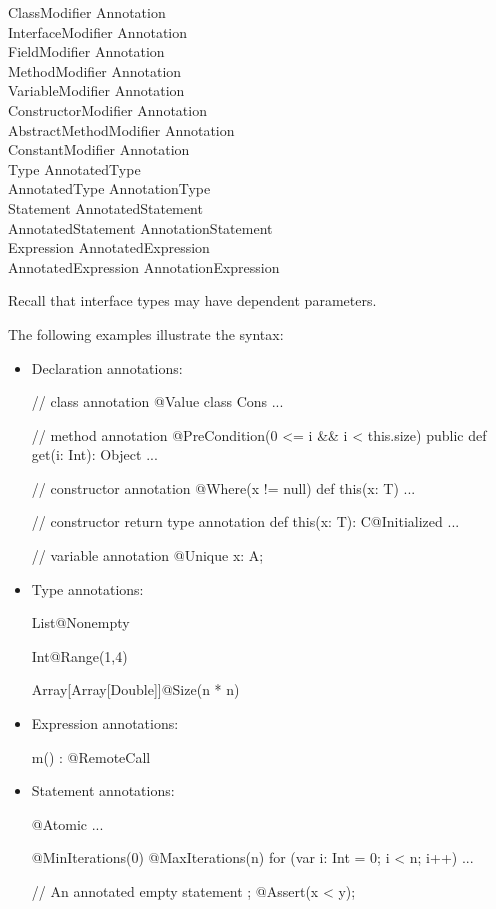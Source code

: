 \begin{grammar}
ClassModifier \: Annotation \\
InterfaceModifier \: Annotation \\
FieldModifier \: Annotation \\
MethodModifier \: Annotation \\
VariableModifier \: Annotation \\
ConstructorModifier \: Annotation \\
AbstractMethodModifier \: Annotation \\
ConstantModifier \: Annotation \\
Type \: AnnotatedType \\
AnnotatedType \: Annotation\plus Type \\
Statement \: AnnotatedStatement \\
AnnotatedStatement \: Annotation\plus Statement \\
Expression \: AnnotatedExpression \\
AnnotatedExpression \: Annotation\plus Expression \\
\end{grammar}

\noindent
Recall that interface types may have dependent parameters.

\noindent
The following examples illustrate the syntax:

\begin{itemize}
\item Declaration annotations:
\begin{xtennoindent}
  // class annotation
  @Value
  class Cons { ... }

  // method annotation
  @PreCondition(0 <= i && i < this.size)
  public def get(i: Int): Object { ... }

  // constructor annotation
  @Where(x != null)
  def this(x: T) { ... }

  // constructor return type annotation
  def this(x: T): C@Initialized { ... }

  // variable annotation
  @Unique x: A;
\end{xtennoindent}
\item Type annotations:
\begin{xtennoindent}
  List@Nonempty

  Int@Range(1,4)

  Array[Array[Double]]@Size(n * n)
\end{xtennoindent}
\item Expression annotations:
\begin{xtennoindent}
  m() : @RemoteCall
\end{xtennoindent}
\item Statement annotations:
\begin{xtennoindent}
  @Atomic { ... }

  @MinIterations(0)
  @MaxIterations(n)
  for (var i: Int = 0; i < n; i++) { ... }

  // An annotated empty statement ;
  @Assert(x < y);
\end{xtennoindent}
\end{itemize}

